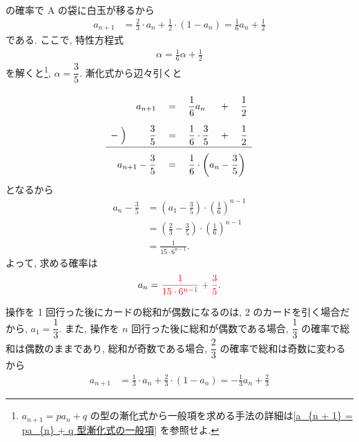 \begin{qenumerate}
{\begin{align}
		\end{align}
		の確率で A の袋に白玉が移るから
		\begin{align}
			a_{n + 1} &= \frac{2}{3}\cdot a_{n} + \frac{1}{2}\cdot\left(1 - a_{n}\right) = \frac{1}{6}a_{n} + \frac{1}{2}
		\end{align}
		である.
		ここで, 特性方程式
		\begin{align}
			\alpha = \frac{1}{6}\alpha + \frac{1}{2}
		\end{align}
		を解くと\footnote{$a_{n + 1} = pa_{n} + q$ の型の漸化式から一般項を求める手法の詳細は\ref{a_{n + 1} = pa_{n} + q 型漸化式の一般項} を参照せよ.}, $\alpha = \dfrac{3}{5}$.
		漸化式から辺々引くと
		\begin{align}
			\def\arraystretch{2.5}
			\begin{array}{rrclcr}
				        & a_{n + 1}                          & {}={} & \dfrac{1}{6}a_{n}                                  & {}+{} & \dfrac{1}{2} \\
				-\Bigm) & \dfrac{3}{5}                       & {}={} & \dfrac{1}{6}\cdot\dfrac{3}{5}                      & {}+{} & \dfrac{1}{2} \\ \hline
				\multicolumn{2}{r}{a_{n + 1} - \dfrac{3}{5}} & {}={} & \multicolumn{3}{l}{\dfrac{1}{6}\cdot\left(a_{n} - \dfrac{3}{5}\right)}
			\end{array}
		\end{align}
		となるから
		\begin{align}
			a_{n} - \frac{3}{5} &= \left(a_{1} - \frac{3}{5}\right)\cdot\left(\frac{1}{6}\right)^{n - 1} \\
				&= \left(\frac{2}{3} - \frac{3}{5}\right)\cdot\left(\frac{1}{6}\right)^{n - 1} \\
				&= \frac{1}{15\cdot 6^{n - 1}}.
		\end{align}
		よって, 求める確率は
		\begin{align}
			a_{n} = \textcolor{red}{\frac{1}{15\cdot 6^{n - 1}} + \frac{3}{5}}.
		\end{align}
	}
	\item{
		操作を 1 回行った後にカードの総和が偶数になるのは, 2 のカードを引く場合だから, $a_{1} = \dfrac{1}{3}$.
		また, 操作を $n$ 回行った後に総和が偶数である場合, $\dfrac{1}{3}$ の確率で総和は偶数のままであり, 総和が奇数である場合, $\dfrac{2}{3}$ の確率で総和は奇数に変わるから
		\begin{align}
			a_{n + 1} &= \frac{1}{3}\cdot a_{n} + \frac{2}{3}\cdot\left(1 - a_{n}\right) = -\frac{1}{3}a_{n} + \frac{2}{3}
		\end{align}
}
\end{qenumerate}
